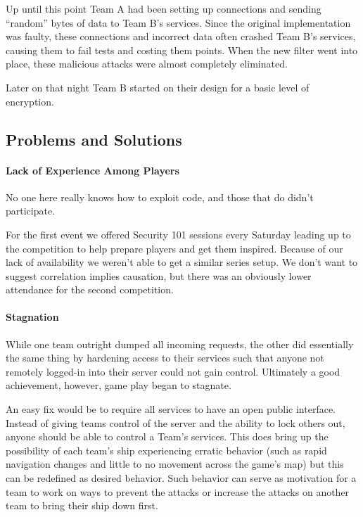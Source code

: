 \documentclass[10pt]{article}
\begin{document}
Up until this point Team A had been setting up connections and sending ``random''
bytes of data to Team B's services. Since the original implementation was
faulty, these connections and incorrect data often crashed Team B's services,
causing them to fail tests and costing them points. When the new filter went
into place, these malicious attacks were almost completely eliminated.

Later on that night Team B started on their design for a basic level of
encryption. 

\subsection{Problems and Solutions}

\paragraph*{Lack of Experience Among Players} No one here really knows how to
exploit code, and those that do didn't participate.

For the first event we offered Security 101 sessions every Saturday leading up
to the competition to help prepare players and get them inspired. Because of
our lack of availability we weren't able to get a similar series setup. We
don't want to suggest correlation implies causation, but there was an obviously
lower attendance for the second competition.

\paragraph*{Stagnation} While one team outright dumped all incoming requests, 
the other did essentially the same thing by hardening access to their services
such that anyone not remotely logged-in into their server could not gain
control. Ultimately a good achievement, however, game play began to stagnate.

An easy fix would be to require all services to have an open public interface.
Instead of giving teams control of the server and the ability to lock others
out, anyone should be able to control a Team's services. This does bring up the
possibility of each team's ship experiencing erratic behavior (such as rapid
navigation changes and little to no movement across the game's map) but this
can be redefined as desired behavior. Such behavior can serve as motivation for
a team to work on ways to prevent the attacks or increase the attacks on
another team to bring their ship down first.
\end{document}
